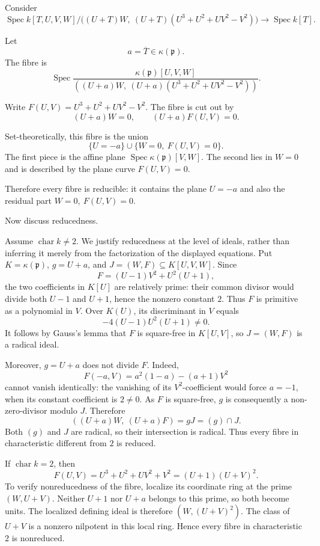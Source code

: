 Consider
\[
\operatorname{Spec}
k[T,U,V,W]/
\bigl((U+T)W,\ (U+T)(U^3+U^2+UV^2-V^2)\bigr)
\longrightarrow
\operatorname{Spec}k[T].
\]

Let
\[
a=\overline{T}\in \kappa(\mathfrak{p}).
\]
The fibre is
\[
\operatorname{Spec}
\frac{\kappa(\mathfrak{p})[U,V,W]}
{
	((U+a)W,\ (U+a)(U^3+U^2+UV^2-V^2))
}.
\]

Write \(F(U,V)=U^3+U^2+UV^2-V^2\). The fibre is cut out by
\[
(U+a)W=0,
\qquad
(U+a)F(U,V)=0.
\]

Set-theoretically, this fibre is the union
\[
\{U=-a\}
\cup
\{W=0,\ F(U,V)=0\}.
\]
The first piece is the affine plane \(\operatorname{Spec}\kappa(\mathfrak p)[V,W]\). The second lies in \(W=0\) and is described by the plane curve \(F(U,V)=0\).

Therefore every fibre is reducible: it contains the plane \(U=-a\) and
also the residual part \(W=0,\ F(U,V)=0\).

Now discuss reducedness.

Assume \(\operatorname{char}k\neq 2\). We justify reducedness
at the level of ideals, rather than inferring it merely from the
factorization of the displayed equations. Put
\(K=\kappa(\mathfrak p)\), \(g=U+a\), and
\(J=(W,F)\subseteq K[U,V,W]\).
Since
\[
F=(U-1)V^2+U^2(U+1),
\]
the two coefficients in \(K[U]\) are relatively prime: their common
divisor would divide both \(U-1\) and \(U+1\), hence the nonzero
constant \(2\). Thus \(F\) is primitive as a polynomial in \(V\).
Over \(K(U)\), its discriminant in \(V\) equals
\[
-4(U-1)U^2(U+1)\neq0.
\]
It follows by Gauss's lemma that \(F\) is square-free in
\(K[U,V]\), so \(J=(W,F)\) is a radical ideal.

Moreover, \(g=U+a\) does not divide \(F\). Indeed,
\[
F(-a,V)=a^2(1-a)-(a+1)V^2
\]
cannot vanish identically: the vanishing of its \(V^2\)-coefficient
would force \(a=-1\), when its constant coefficient is \(2\neq0\).
As \(F\) is square-free, \(g\) is consequently a non-zero-divisor
modulo \(J\). Therefore
\[
((U+a)W,\ (U+a)F)
=gJ=(g)\cap J.
\]
Both \((g)\) and \(J\) are radical, so their intersection is radical.
Thus every fibre in characteristic different from \(2\) is reduced.

If \(\operatorname{char}k=2\), then
\[
F(U,V)
=
U^3+U^2+UV^2+V^2
=
(U+1)(U+V)^2.
\]
To verify nonreducedness of the fibre, localize its coordinate ring at
the prime \((W,U+V)\). Neither \(U+1\) nor \(U+a\) belongs to this
prime, so both become units. The localized defining ideal is therefore
\((W,(U+V)^2)\). The class of \(U+V\) is a nonzero nilpotent in this
local ring. Hence every fibre in characteristic \(2\) is nonreduced.

